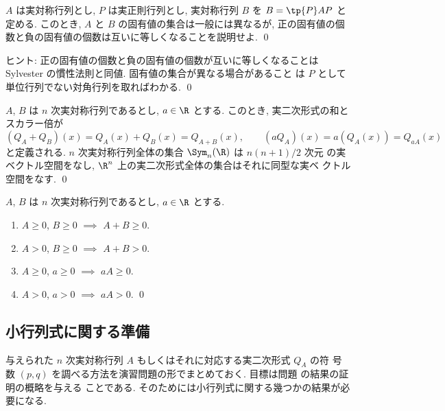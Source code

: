 \documentclass[12pt,twoside]{jarticle}
\begin{document}

\begin{question}
  $A$ は実対称行列とし, $P$ は実正則行列とし, 
  実対称行列 $B$ を $B=\tp{P}AP$ と定める.
  このとき, $A$ と $B$ の固有値の集合は一般には異なるが,
  正の固有値の個数と負の固有値の個数は互いに等しくなることを説明せよ.
  \qed
\end{question}

\noindent
ヒント: 正の固有値の個数と負の固有値の個数が互いに等しくなることは 
Sylvester の慣性法則と同値.  固有値の集合が異なる場合があること
は $P$ として単位行列でない対角行列を取ればわかる.
\qed


\begin{question}
  $A$, $B$ は $n$ 次実対称行列であるとし, $a\in\R$ とする.
  このとき, 実二次形式の和とスカラー倍が
  \begin{equation*}
    (Q_A+Q_B)(x) = Q_A(x) + Q_B(x) = Q_{A+B}(x), \qquad
    (a Q_A)(x) = a(Q_A(x)) = Q_{aA}(x)
  \end{equation*}
  と定義される.  $n$ 次実対称行列全体の集合 $\Sym_n(\R)$ は $n(n+1)/2$ 次元
  の実ベクトル空間をなし, $\R^n$ 上の実二次形式全体の集合はそれに同型な実ベ
  クトル空間をなす. \qed
\end{question}


\begin{question}
  $A$, $B$ は $n$ 次実対称行列であるとし, $a\in\R$ とする.
  \begin{enumerate}
  \item $A\ge0$, $B\ge 0$ $\implies$ $A+B\ge0$.
  \item $A>0$, $B\ge 0$ $\implies$ $A+B>0$.
  \item $A\ge0$, $a\ge 0$ $\implies$ $aA\ge 0$.
  \item $A>0$, $a> 0$ $\implies$ $aA> 0$.
    \qed
  \end{enumerate}
\end{question}


\subsection{小行列式に関する準備}
\label{sec:minor}

与えられた $n$ 次実対称行列 $A$ もしくはそれに対応する実二次形式 $Q_A$ の符
号数 $(p,q)$ を調べる方法を演習問題の形でまとめておく.
目標は問題   の結果の証明の概略を与える
ことである. そのためには小行列式に関する幾つかの結果が必要になる. 
\end{document}
